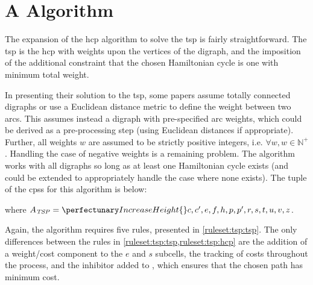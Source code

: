 \section{A   Algorithm}\label{sec:tsp:algotsp}

The expansion of the \gls{hcp} algorithm to solve the \gls{tsp} is fairly straightforward.  The \gls{tsp} is the \gls{hcp} with weights upon the vertices of the digraph, and the imposition of the additional constraint that the chosen Hamiltonian cycle is one with minimum total weight.  

In presenting their solution to the \gls{tsp}, some papers assume totally connected digraphs or use a Euclidean distance metric to define the weight between two arcs.  This  assumes instead a digraph with pre-specified arc weights, which could be derived as a pre-processing step (using Euclidean distances if appropriate).   Further, all weights \(w\) are assumed to be strictly positive integers, i.e. \(\forall w, w \in \mathbb{N}^+\).  Handling the case of negative weights is a remaining problem.  The algorithm works with all digraphs so long as at least one Hamiltonian cycle exists (and could be extended to appropriately handle the case where none exists).  The tuple of the \glspl{cps} for this algorithm is below:


\noindent
where \(A_{\mathit{TSP}} = \cpset{c, c', e, f, h, p, p', r, s, t, u, v, z}\).

Again, the algorithm requires five rules, presented in \cref{ruleset:tsp:tsp}.  The only differences between the rules in \cref{ruleset:tsp:tsp,ruleset:tsp:hcp} are the addition of a weight/cost component to the \(e\) and \(s\) subcells, the tracking of costs throughout the process, and the \gls{inhibitor} added to , which ensures that the chosen path has minimum cost.

